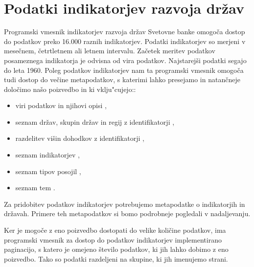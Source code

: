 \section{Podatki indikatorjev razvoja držav}
\label{sec:podatki_ind_razvoja}



Programski vmesnik indikatorjev razvoja držav Svetovne banke omogoča dostop
do podatkov preko 16.000 raznih indikatorjev. Podatki indikatorjev so merjeni v
mesečnem, četrtletnem ali letnem intervalu. Začetek meritev podatkov
posameznega indikatorja je odvisna od vira podatkov. Najstarejši podatki segajo
do leta 1960. Poleg podatkov indikatorjev nam ta programski vmesnik omogoča 
tudi dostop do večine metapodatkov, s katerimi lahko presejamo in natančneje
določimo našo poizvedbo in ki vklju"cujejo::
\begin{itemize}
\item viri podatkov in njihovi opisi 
  ,
\item seznam držav, skupin držav in regij z identifikatorji 
  ,
\item razdelitev višin dohodkov z identifikatorji 
  ,
\item seznam indikatorjev 
  ,
\item seznam tipov posojil 
  ,
\item seznam tem 
  .
\end{itemize}

Za pridobitev podatkov indikatorjev potrebujemo metapodatke o indikatorjih in
državah. Primere teh metapodatkov si bomo podrobneje pogledali v nadaljevanju.

Ker je mogoče z eno poizvedbo dostopati do velike količine podatkov, ima
programski vmesnik za dostop do podatkov indikatorjev implementirano
paginacijo,
s katero je omejeno število podatkov, ki jih lahko dobimo z eno
poizvedbo. Tako so podatki razdeljeni na skupine, ki jih imenujemo strani.

